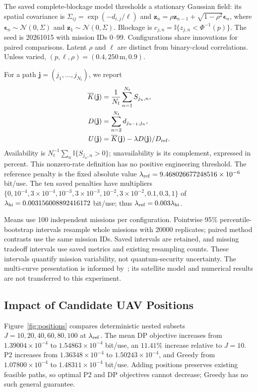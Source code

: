 The saved complete-blockage model thresholds a stationary Gaussian
field: its spatial covariance is $\Sigma_{ij}=\exp(-d_{i,j}/\ell)$ and
$\mathbf z_n=\rho\mathbf z_{n-1}+\sqrt{1-\rho^2}\boldsymbol\epsilon_n$,
where $\boldsymbol\epsilon_n\sim\mathcal N(0,\Sigma)$ and
$\mathbf z_1\sim\mathcal N(0,\Sigma)$. Blockage is
$c_{j,n}=\mathbb I\{z_{j,n}<\Phi^{-1}(p)\}$.
The seed is 20261015 with mission IDs 0--99. Configurations share
innovations for paired comparisons. Latent $\rho$ and $\ell$ are
distinct from binary-cloud correlations. Unless varied,
$(p,\ell,\rho)=(0.4,250\,\mathrm m,0.9)$.

For a path $\mathbf j=(j_1,\ldots,j_{N_t})$, we report
\begin{align}
 \overline K(\mathbf j)&=\frac{1}{N_t}\sum_{n=1}^{N_t}S_{j_n,n},
 \label{eq:mean_skr}\\
 D(\mathbf j)&=\sum_{n=2}^{N_t}d_{j_{n-1},j_n},\label{eq:distance}\\
 U(\mathbf j)&=\overline K(\mathbf j)-\lambda D(\mathbf j)/D_{\rm ref}.
 \label{eq:utility}
\end{align}
Availability is $N_t^{-1}\sum_n\mathbb I\{S_{j_n,n}>0\}$;
unavailability is its complement, expressed in percent. This nonzero-rate
definition has no positive engineering threshold. The reference penalty
is the fixed absolute value
$\lambda_{\rm ref}=9.468026677248516\times10^{-6}$ bit/use.
The ten saved penalties have multipliers
$\{0,10^{-4},3\times10^{-4},10^{-3},3\times10^{-3},10^{-2},
3\times10^{-2},0.1,0.3,1\}$ of
$\lambda_{\rm hi}=0.003156008892416172$ bit/use; thus
$\lambda_{\rm ref}=0.003\lambda_{\rm hi}$.

Means use 100 independent missions per configuration. Pointwise 95\%
percentile-bootstrap intervals resample whole missions with 20000
replicates; paired method contrasts use the same mission IDs. Saved
intervals are retained, and missing tradeoff intervals use saved metrics
and existing resampling counts. These intervals quantify mission
variability, not quantum-security uncertainty. The multi-curve
presentation is informed by~\cite{gong2020}; its satellite model and
numerical results are not transferred to this experiment.

\subsection{Impact of Candidate UAV Positions}
Figure~\ref{fig:positions} compares deterministic nested subsets
$J=10,20,40,60,80,100$ at $\lambda_{\rm ref}$. The mean DP objective
increases from $1.39004\times10^{-4}$ to $1.54863\times10^{-4}$ bit/use,
an $11.41\%$ increase relative to $J=10$. P2 increases from
$1.36348\times10^{-4}$ to $1.50243\times10^{-4}$, and Greedy from
$1.07800\times10^{-4}$ to $1.48311\times10^{-4}$ bit/use.
Adding positions preserves existing feasible paths, so optimal P2 and
DP objectives cannot decrease; Greedy has no such general guarantee.

